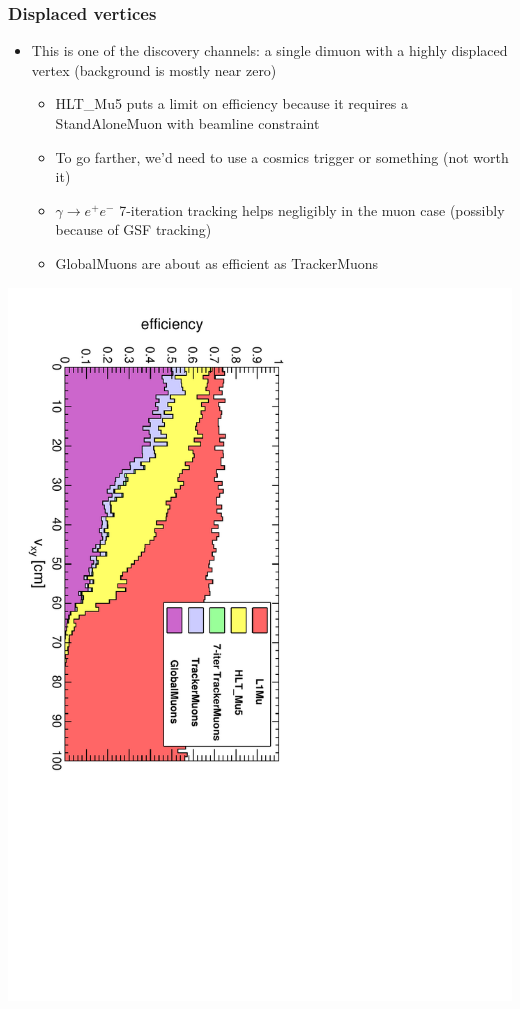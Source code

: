 \documentclass[compress]{beamer}
\begin{document}
\begin{frame}
\frametitle{Displaced vertices}

\begin{itemize}
\item This is one of the discovery channels: a single dimuon with a highly displaced vertex (background is mostly near zero)
\begin{itemize}
\item HLT\_Mu5 puts a limit on efficiency because it requires a StandAloneMuon with beamline constraint
\item To go farther, we'd need to use a cosmics trigger or something (not worth it)
\item $\gamma \to e^+e^-$ 7-iteration tracking helps negligibly in the muon case (possibly because of GSF tracking)
\item GlobalMuons are about as efficient as TrackerMuons
\end{itemize}
\end{itemize}

\includegraphics[height=0.7\linewidth, angle=90]{dispvert.pdf}
\end{frame}
\end{document}

